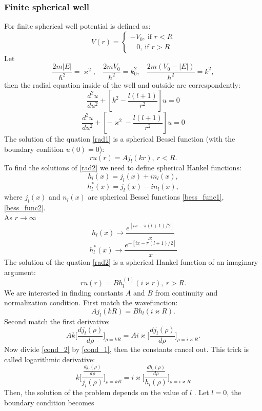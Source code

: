 \documentclass[a4paper, 14pt]{article}
\begin{document}
\subsubsection{Finite spherical well}
For finite spherical well  potential is defined as:
$$V(r)=\begin{cases}
-V_0, ~\text{if } r< R\\
~~~~0, ~\text{if } r>R
\end{cases}$$
Let
$$\frac{2m|E|}{\hbar^2} = \varkappa^2, ~~~~\frac{2m V_0}{\hbar^2}=k_0^2, ~~~~\frac{2m(V_0-|E|)}{\hbar^2} =k^2,$$
then the radial equation inside of the well and outside are correspondently:
\begin{equation}\label{rad1}
	\frac{d^2 u}{du^2}+[k^2-\frac{l(l+1)}{r^2}]u=0
\end{equation}
\begin{equation}\label{rad2}
	\frac{d^2 u}{du^2}+[-\varkappa^2-\frac{l(l+1)}{r^2}]u=0
\end{equation}
The solution of the quation \eqref{rad1} is a spherical Bessel function (with the boundary confition $u(0) =0$):
$$r u(r) =A j_l(kr), ~r< R.$$
To find the solutions of \eqref{rad2} we need to define spherical Hankel functions:
$$h_l(x) = j_l(x)+in_l(x),$$
$$h_l^*(x)=j_l(x)-in_l(x),$$
where $j_l(x)$ and $n_l(x)$ are spherical Bessel functions \eqref{bess_func1}, \eqref{bess_func2}.\\
As $r \to \infty$
$$h_l(x) \to \frac{e^{[ix-\pi (l+1)/2]}}{x}$$
$$h_l^*(x) \to \frac{e^{-[ix-\pi (l+1)/2]}}{x}$$
The solution of the quation \eqref{rad2} is a spherical Hankel function of an imaginary argument:
$$r u(r) = B h_l^{(1)}(i \varkappa r), ~r>R.$$
We are interested in finding constants $A$ and $B$ from continuity and normalization condition. First match the wavefunction:
\begin{equation}\label{cond_1}
	A j_l(kR)=B h_l(i \varkappa R).
\end{equation}
Second match the first derivative:
\begin{equation}\label{cond_2}
	A k \bigg[\frac{d j_l(\rho)}{d\rho}\bigg]_{\rho = kR} = A i \varkappa \bigg[\frac{d j_l(\rho)}{d\rho}\bigg]_{\rho = i \varkappa R}.
\end{equation}
Now divide \eqref{cond_2} by \eqref{cond_1}, then the constants cancel out. This trick is called logarithmic derivative:
$$k\bigg[ \frac{\frac{d j_l(\rho)}{d \rho}}{j_l(\rho)} \bigg]_{\rho = kR} = i\varkappa \bigg[ \frac{\frac{d h_l(\rho)}{d \rho}}{h_l(\rho)} \bigg]_{\rho = i \varkappa R} $$
 Then, the solution of the problem depends on the value of $l$ . Let $l=0$, the boundary condition becomes
\end{document}
